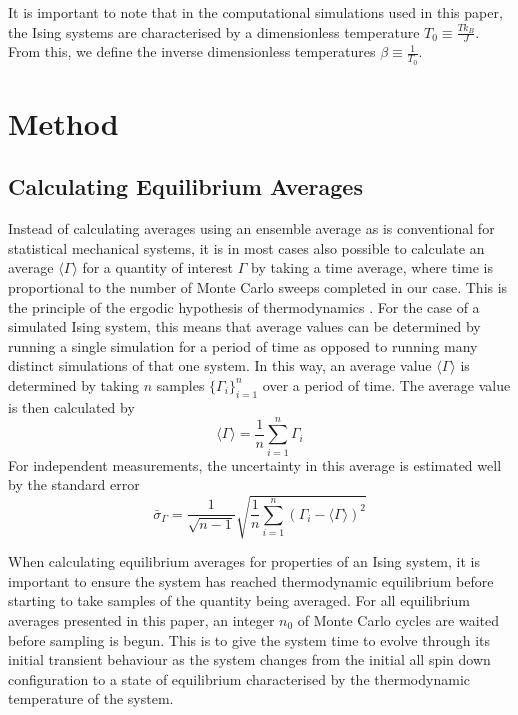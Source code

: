 \documentclass[11pt]{iopart}
\begin{document}
It is important to note that in the computational simulations used in this paper, the Ising systems are characterised by a dimensionless temperature $T_0 \equiv \frac{T k_B}{J}$. From this, we define the inverse dimensionless temperatures $\beta \equiv \frac{1}{T_0}$.


\section{Method}

\subsection{Calculating Equilibrium Averages}

Instead of calculating averages using an ensemble average as is conventional for statistical mechanical systems, it is in most cases also possible to calculate an average $\langle \Gamma \rangle$ for a quantity of interest $\Gamma$ by taking a time average, where time is proportional to the number of Monte Carlo sweeps completed in our case. This is the principle of the ergodic hypothesis of thermodynamics \cite{statmech}.  For the case of a simulated Ising system, this means that average values can be determined by running a single simulation for a period of time as opposed to running many distinct simulations of that one system. In this way, an average value $\langle \Gamma \rangle$ is determined by taking $n$ samples $\{ \Gamma_i \}_{i=1}^{n}$ over a period of time. The average value is then calculated by
\begin{equation}
\label{eq:averages}
\langle \Gamma \rangle = \frac{1}{n}\sum_{i=1}^{n} \Gamma_i
\end{equation}
For independent measurements, the uncertainty in this average is estimated well by the standard error \cite{handout}
\begin{equation}
\label{eq:standarderror}
\bar{\sigma}_{\Gamma} = \frac{1}{\sqrt{n-1}} \sqrt{ \frac{1}{n} \sum_{i=1}^{n} \left( \Gamma_i - \langle \Gamma \rangle \right)^2 }
\end{equation}

When calculating equilibrium averages for properties of an Ising system, it is important to ensure the system has reached thermodynamic equilibrium before starting to take samples of the quantity being averaged. For all equilibrium averages presented in this paper, an integer $n_0$ of Monte Carlo cycles are waited before sampling is begun. This is to give the system time to evolve through its initial transient behaviour as the system changes from the initial all spin down configuration to a state of equilibrium characterised by the thermodynamic temperature of the system.
\end{document}

